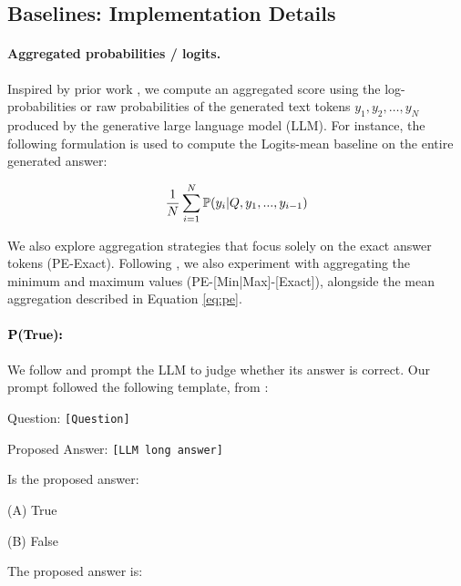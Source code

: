 \documentclass{article} %
\begin{document}
\subsection{Baselines: Implementation Details}
\label{app:baselines}
\paragraph{Aggregated probabilities / logits.}
Inspired by prior work \citep{kadavath2022language, guerreiro2023looking}, we compute an aggregated score using the log-probabilities or raw probabilities of the generated text tokens $y_1, y_2, \ldots, y_N$ produced by the generative large language model (LLM).
For instance, the following formulation is used to compute the Logits-mean baseline on the entire generated answer:

\begin{equation}
\label{eq:pe}
\centering
\frac{1}{N} \sum_{i=1}^N \mathbb{P}(y_i|Q,y_1,...,y_{i-1})
\end{equation}

We also explore aggregation strategies that focus solely on the exact answer tokens (PE-Exact).
Following \citet{varshney2023stitch}, we also experiment with aggregating the minimum and maximum values (PE-[Min|Max]-[Exact]), alongside the mean aggregation described in Equation \ref{eq:pe}.

\paragraph{$\textbf{P(\text{True}):}$} We follow \cite{kadavath2022language} and prompt the LLM to judge whether its answer is correct. Our prompt followed the following template, from \cite{kadavath2022language}:

\begin{mdframed}[backgroundcolor=blue!5, skipabove=0.5\baselineskip]
\small

Question: \texttt{[Question]}

Proposed Answer: \texttt{[LLM long answer]}

Is the proposed answer:

(A) True

(B) False

The proposed answer is:
\end{mdframed}

\end{document}

